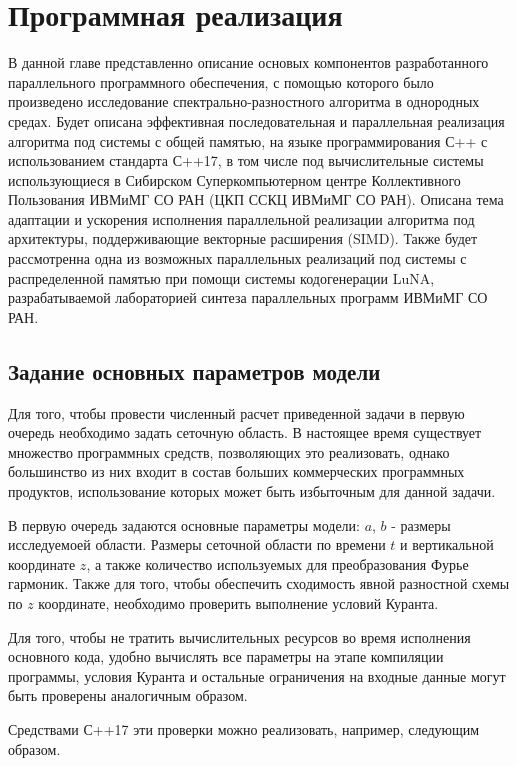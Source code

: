 \section{Программная реализация}

В данной главе представленно описание основых компонентов разработанного параллельного программного обеспечения, 
с помощью которого было произведено исследование спектрально-разностного алгоритма в однородных средах.
Будет описана эффективная последовательная и параллельная реализация алгоритма под системы с общей памятью,
на языке программирования С++ с использованием стандарта С++17, в том числе под вычислительные системы использующиеся в Сибирском Суперкомпьютерном 
центре Коллективного Пользования ИВМиМГ СО РАН (ЦКП ССКЦ ИВМиМГ СО РАН). Описана тема адаптации
и ускорения исполнения параллельной реализации алгоритма под архитектуры, поддерживающие векторные расширения (SIMD).
Также будет рассмотренна одна из возможных параллельных реализаций под системы с распределенной памятью при помощи системы кодогенерации LuNA,
разрабатываемой лабораторией синтеза параллельных программ ИВМиМГ СО РАН.

\subsection{Задание основных параметров модели}

Для того, чтобы провести численный расчет приведенной задачи в первую очередь необходимо задать сеточную область.
В настоящее время существует множество программных средств, позволяющих это реализовать,
однако большинство из них входит в состав больших коммерческих программных продуктов, 
использование которых может быть избыточным для данной задачи.

В первую очередь задаются основные параметры модели: $a$, $b$ - размеры исследуемоей области.
Размеры сеточной области по времени $t$ и вертикальной координате $z$, 
а также количество используемых для преобразования Фурье гармоник. Также для того, чтобы обеспечить
сходимость явной разностной схемы по $z$ координате, необходимо проверить выполнение условий Куранта.

Для того, чтобы не тратить вычислительных ресурсов во время исполнения основного кода, 
удобно вычислять все параметры на этапе компиляции программы, условия Куранта и остальные ограничения на входные данные
могут быть проверены аналогичным образом.

Средствами С++17 эти проверки можно реализовать, например, следующим образом.

